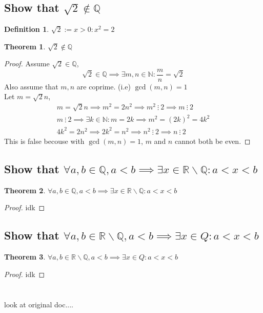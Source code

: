 \documentclass[]{article}
\newcommand{\R}{\mathbb{R}}
\newcommand{\N}{\mathbb{N}}
\newcommand{\Q}{\mathbb{Q}}
\newcommand{\divisible}{ \ \vdots \ }
\newtheorem{definition}{Definition}
\newtheorem{theorem}{Theorem}
\begin{document}
\newpage
\section{}

\subsection{Show that $\sqrt{2} \notin \Q$}
\begin{definition}
    $\sqrt{2} := x > 0 : x^2 = 2$
\end{definition}
\begin{theorem}
    $\sqrt{2} \notin \Q$
\end{theorem}
\begin{proof}
    Assume $\sqrt{2} \in \Q$,
    $$\sqrt{2} \in \Q \implies \exists m,n \in \N : \frac{m}{n} = \sqrt{2}$$
    Also assume that $m,n$ are coprime. (i.e) $\gcd(m,n)=1$\\
    Let $m = \sqrt{2} n$,
    \begin{align*}
        m = \sqrt{2} n \implies m^2 = 2 n^2 \implies m^2 \divisible 2 \implies m \divisible 2\\
        m \divisible 2 \implies \exists k \in \N : m = 2k \implies m^2 = (2k)^2 = 4 k^2\\
        4k^2 = 2 n^2 \implies 2k^2 = n^2 \implies n^2 \divisible 2 \implies n \divisible 2
    \end{align*}
    This is false becouse with $\gcd(m,n)=1$, $m$ and $n$ cannot both be even.
\end{proof}

\subsection{Show that 
    $\forall a,b \in \Q, a < b \implies \exists x \in \R \backslash \Q : a < x < b$
}
\begin{theorem}
    $\forall a,b \in \Q, a < b \implies \exists x \in \R \backslash \Q : a < x < b$
\end{theorem}
\begin{proof}
    idk
\end{proof}





\subsection{Show that
    $\forall a,b \in \R \backslash \Q, a < b \implies \exists x \in Q : a < x < b$
}
\begin{theorem}
    $\forall a,b \in \R \backslash \Q, a < b \implies \exists x \in Q : a < x < b$
\end{theorem}
\begin{proof}
    idk
\end{proof}






\newpage
\section{}

\subsection{}
look at original doc....
\end{document}
